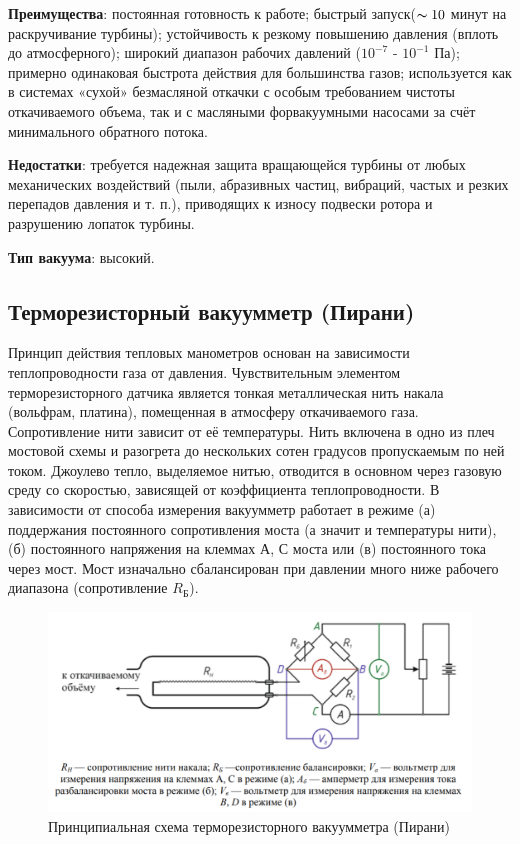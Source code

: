 \documentclass[a4paper, 12pt]{article} %
\begin{document}
\textbf{Преимущества}: постоянная готовность к работе; быстрый запуск($\thicksim 10$ минут на раскручивание турбины); устойчивость к резкому повышению давления (вплоть до атмосферного); широкий диапазон рабочих давлений ($10^{-7}$ - $10^{-1}$ Па); примерно одинаковая быстрота действия для большинства газов; используется как в системах «сухой» безмасляной откачки с особым требованием чистоты откачиваемого объема, так и с масляными форвакуумными насосами за счёт минимального обратного потока.

\textbf{Недостатки}: требуется надежная защита вращающейся турбины от любых механических воздействий (пыли, абразивных частиц, вибраций, частых и резких перепадов давления и т. п.), приводящих к износу подвески ротора и разрушению лопаток турбины.

\textbf{Тип вакуума}: высокий.


\subsection{Терморезисторный вакуумметр (Пирани)}

Принцип действия тепловых манометров основан на зависимости
теплопроводности газа от давления. Чувствительным элементом терморезисторного датчика является тонкая металлическая нить накала (вольфрам, платина), помещенная в атмосферу откачиваемого газа. Сопротивление нити зависит от её температуры. Нить включена в одно из плеч мостовой схемы и разогрета до нескольких сотен градусов пропускаемым по ней током. Джоулево тепло, выделяемое нитью, отводится в основном через газовую среду со скоростью, зависящей от коэффициента теплопроводности. В зависимости от способа измерения вакуумметр работает в режиме (а) поддержания постоянного сопротивления моста (а значит и температуры нити), (б) постоянного напряжения на клеммах $А$, $С$ моста или (в) постоянного тока через мост. Мост изначально сбалансирован при давлении много ниже рабочего диапазона (сопротивление $R_{\text{Б}}$).

\begin{figure}[h]
    \centering
    \includegraphics[width = 13 cm]{Пирани}
    \caption{Принципиальная схема терморезисторного вакуумметра (Пирани)}
    \label{fig:vac}
\end{figure}
\end{document}
